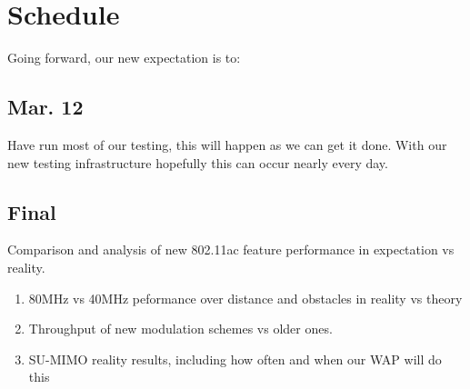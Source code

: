 \section{Schedule}


Going forward, our new expectation is to:

\subsection{Mar. 12}
Have run most of our testing, this will happen as we can get it
done. With our new testing infrastructure hopefully this can occur
nearly every day.

\subsection{Final}
Comparison and analysis of new 802.11ac feature performance in expectation vs reality.
\begin{enumerate}
\item 80MHz vs 40MHz peformance over distance and obstacles in reality vs theory
\item Throughput of new modulation schemes vs older ones.
\item SU-MIMO reality results, including how often and when our WAP will do this
\end{enumerate}
